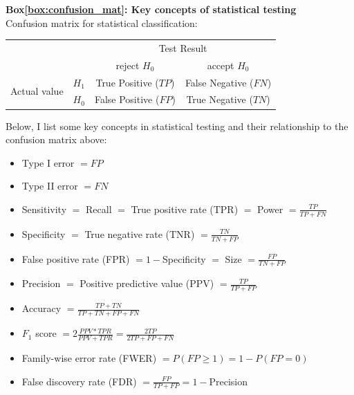 \begin{Comment}
\hspace{-2.5mm}\textbf{Box\ref{box:confusion_mat}: Key concepts of statistical testing}\label{box:confusion_mat}\\
Confusion matrix for statistical classification:

\begin{center}
\begin{tabular}{l|l|c|c|}
\multicolumn{2}{c}{}&\multicolumn{2}{c}{Test Result}\\
\cline{3-4}
\multicolumn{2}{c|}{}&reject $H_0$&accept $H_0$\\
\cline{2-4}
\multirow{2}{*}{Actual value}& $H_1$ & True Positive ($TP$) & False Negative ($FN$)\\
\cline{2-4}
& $H_0$ & False Positive ($FP$) & True Negative ($TN$)\\
\cline{2-4}
\end{tabular}
\end{center}

\vspace{3mm}
Below, I list some key concepts in statistical testing and their relationship to the confusion matrix above:

\begin{itemize}
    \item Type I error $= FP$
    \item Type II error $= FN$
    \item Sensitivity $=$ Recall $=$ True positive rate (TPR) $=$ Power $=\frac{TP}{TP+FN}$
    \item Specificity $=$ True negative rate (TNR) $=\frac{TN}{TN+FP}$
    \item False positive rate (FPR) $= 1-$Specificity $=$ Size $=\frac{FP}{TN+FP}$
    \item Precision $=$ Positive predictive value (PPV) $=\frac{TP}{TP+FP}$
    \item Accuracy $=\frac{TP+TN}{TP+TN+FP+FN}$
    \item $F_1$ score $=2 \frac{PPV*TPR}{PPV+TPR}=\frac{2TP}{2TP+FP+FN}$
    \item Family-wise error rate (FWER) $=P(FP \geq 1)= 1 - P(FP=0)$
    \item False discovery rate (FDR) $=\frac{FP}{TP+FP}= 1- $Precision
\end{itemize}

\vfill

\end{Comment}

